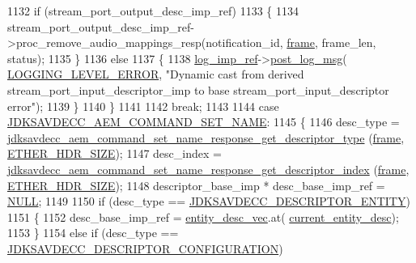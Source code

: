 \begin{DoxyCode}
{{1132             \textcolor{keywordflow}{if} (stream\_port\_output\_desc\_imp\_ref)
1133             \{
1134                 stream\_port\_output\_desc\_imp\_ref->proc\_remove\_audio\_mappings\_resp(notification\_id, 
      \hyperlink{gst__avb__playbin_8c_ac8e710e0b5e994c0545d75d69868c6f0}{frame}, frame\_len, status);
1135             \}
1136             \textcolor{keywordflow}{else}
1137             \{
1138                 \hyperlink{namespaceavdecc__lib_acbe3e2a96ae6524943ca532c87a28529}{log\_imp\_ref}->\hyperlink{classavdecc__lib_1_1log_a68139a6297697e4ccebf36ccfd02e44a}{post\_log\_msg}(
      \hyperlink{namespaceavdecc__lib_a501055c431e6872ef46f252ad13f85cdaf2c4481208273451a6f5c7bb9770ec8a}{LOGGING\_LEVEL\_ERROR}, \textcolor{stringliteral}{"Dynamic cast from derived stream\_port\_input\_descriptor\_imp to base
       stream\_port\_input\_descriptor error"});
1139             \}
1140         \}
1141 
1142         \textcolor{keywordflow}{break};
1143 
1144     \textcolor{keywordflow}{case} \hyperlink{group__command_ga67c447f46660cc499e4175923e99d32c}{JDKSAVDECC\_AEM\_COMMAND\_SET\_NAME}:
1145     \{
1146         desc\_type = \hyperlink{group__command__set__name__response_ga3a95f51790a717c477cf1729aa02306e}{jdksavdecc\_aem\_command\_set\_name\_response\_get\_descriptor\_type}
      (\hyperlink{gst__avb__playbin_8c_ac8e710e0b5e994c0545d75d69868c6f0}{frame}, \hyperlink{namespaceavdecc__lib_a6c827b1a0d973e18119c5e3da518e65ca9512ad9b34302ba7048d88197e0a2dc0}{ETHER\_HDR\_SIZE});
1147         desc\_index = 
      \hyperlink{group__command__set__name__response_gac265a30c605f8469b6add2d6f1dd254d}{jdksavdecc\_aem\_command\_set\_name\_response\_get\_descriptor\_index}
      (\hyperlink{gst__avb__playbin_8c_ac8e710e0b5e994c0545d75d69868c6f0}{frame}, \hyperlink{namespaceavdecc__lib_a6c827b1a0d973e18119c5e3da518e65ca9512ad9b34302ba7048d88197e0a2dc0}{ETHER\_HDR\_SIZE});
1148         descriptor\_base\_imp * desc\_base\_imp\_ref = \hyperlink{openavb__types__base__pub_8h_a070d2ce7b6bb7e5c05602aa8c308d0c4}{NULL};
1149 
1150         \textcolor{keywordflow}{if} (desc\_type == \hyperlink{group__descriptor_gaf06b7a0bf808dc8e3104511947d694c4}{JDKSAVDECC\_DESCRIPTOR\_ENTITY})
1151         \{
1152             desc\_base\_imp\_ref = \hyperlink{classavdecc__lib_1_1end__station__imp_a72edab41bc56e3c1757944a7df188a3d}{entity\_desc\_vec}.at(
      \hyperlink{classavdecc__lib_1_1end__station__imp_afd78c89df26ba7641e1adb764c0e827d}{current\_entity\_desc});
1153         \}
1154         \textcolor{keywordflow}{else} \textcolor{keywordflow}{if} (desc\_type == \hyperlink{group__descriptor_ga645687847f92dc28bcb37a7c334cb875}{JDKSAVDECC\_DESCRIPTOR\_CONFIGURATION})
}}
\end{DoxyCode}
